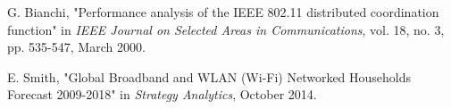  G. Bianchi, "Performance analysis of the IEEE 802.11 distributed coordination function" in {\it IEEE Journal on Selected Areas in Communications}, vol. 18, no. 3, pp. 535-547, March 2000.

 E. Smith, "Global Broadband and WLAN (Wi-Fi) Networked Households Forecast 2009-2018" in {\it Strategy Analytics}, October 2014.
